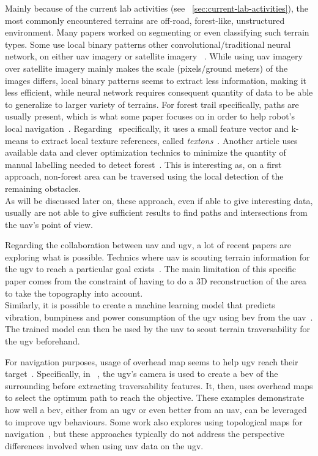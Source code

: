 Mainly because of the current lab activities (see ~\ref{sec:current-lab-activities}), the most commonly encountered terrains
are off-road, forest-like, unstructured environment.
Many papers worked on segmenting or even classifying such terrain types.
Some use local binary patterns other convolutional/traditional neural network, on either \gls{uav} imagery or satellite imagery
~\cite{khan_visual_2012,sofman_terrain_2006,kulic_--spot_2017}.
While using \gls{uav} imagery over satellite imagery mainly makes the scale (pixels/ground meters) of the images differs,
local binary patterns seems to extract less information, making it less efficient, while neural network requires consequent quantity of data to be
able to generalize to larger variety of terrains.
For forest trail specifically, paths are usually present, which is what some paper focuses on in order to help robot's local navigation~\cite{rasmussen_appearance_2009,giusti_machine_2016}.
Regarding~\textcite{rasmussen_appearance_2009} specifically, it uses a small feature vector and k-means to extract local texture
references, called \textit{textons}~\cite{rufus_blas_fast_2008}.
Another article uses available data and clever optimization technics to minimize the quantity of manual labelling needed
to detect forest~\parencite{bosch_journal_2020}.
This is interesting as, on a first approach, non-forest area can be traversed using the local detection of the remaining obstacles.\\
As will be discussed later on, these approach, even if able to give interesting data, usually are not able to give
sufficient results to find paths and intersections from the \gls{uav}'s point of view.

Regarding the collaboration between \gls{uav} and \gls{ugv}, a lot of recent papers are exploring what is possible.
Technics where \gls{uav} is scouting terrain information for the \gls{ugv} to reach a particular goal exists~\cite{delmerico_active_2017}.
The main limitation of this specific paper comes from the constraint of having to do a 3D reconstruction of the area to take the topography
into account.\\
Similarly, it is possible to create a machine learning model that predicts vibration, bumpiness and power consumption of the
\gls{ugv} using \gls{bev} from the \gls{uav}~\cite{fortin_uav-assisted_2024}.
The trained model can then be used by the \gls{uav} to scout terrain traversability for the \gls{ugv} beforehand.

For navigation purposes, usage of overhead map seems to help \gls{ugv} reach their target~\cite{zhang_dual-bev_2025, shah_viking_2022}.
Specifically, in ~\textcite{zhang_dual-bev_2025}, the \gls{ugv}'s camera is used to create a \gls{bev} of the surrounding before extracting traversability features.
It, then, uses overhead maps to select the optimum path to reach the objective.
These examples demonstrate how well a \gls{bev}, either from an \gls{ugv} or even better from an \gls{uav}, can be leveraged to improve \gls{ugv} behaviours.
Some work also explores using topological maps for navigation~\cite{han_effective_2020}, but these approaches typically do not address the
perspective differences involved when using \gls{uav} data on the \gls{ugv}.

